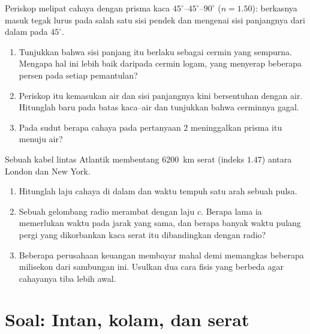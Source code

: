 \begin{exercise}[$\star\star\star$]\label{exo:g10:refraction:14}
Periskop melipat cahaya dengan prisma kaca
$45^\circ$--$45^\circ$--$90^\circ$ ($n = 1.50$): berkasnya masuk tegak
lurus pada salah satu sisi pendek dan mengenai sisi panjangnya dari
dalam pada $45^\circ$.
\begin{enumerate}
  \item Tunjukkan bahwa sisi panjang itu berlaku sebagai cermin yang
        sempurna. Mengapa hal ini lebih baik daripada cermin logam,
        yang menyerap beberapa persen pada setiap pemantulan?
  \item Periskop itu kemasukan air dan sisi panjangnya kini bersentuhan
        dengan air. Hitunglah  baru pada batas kaca--air
        dan tunjukkan bahwa cerminnya gagal.
  \item Pada sudut berapa cahaya pada pertanyaan 2 meninggalkan prisma
        itu menuju air?
\end{enumerate}
\end{exercise}

\begin{exercise}[$\star\star\star$]\label{exo:g10:refraction:15}
Sebuah kabel lintas Atlantik membentang \qty{6200}{km} serat (indeks
 $1.47$) antara London dan New York.
\begin{enumerate}
  \item Hitunglah laju cahaya di dalam  dan waktu tempuh satu
        arah sebuah pulsa.
  \item Sebuah gelombang radio merambat dengan laju $c$. Berapa lama
        ia memerlukan waktu pada jarak yang sama, dan berapa banyak
        waktu pulang pergi yang dikorbankan kaca serat itu dibandingkan
        dengan radio?
  \item Beberapa perusahaan keuangan membayar mahal demi memangkas
        beberapa milisekon dari sambungan ini. Usulkan dua cara fisis
        yang berbeda agar cahayanya tiba lebih awal.
\end{enumerate}
\end{exercise}

\section{Soal: Intan, kolam, dan serat}

